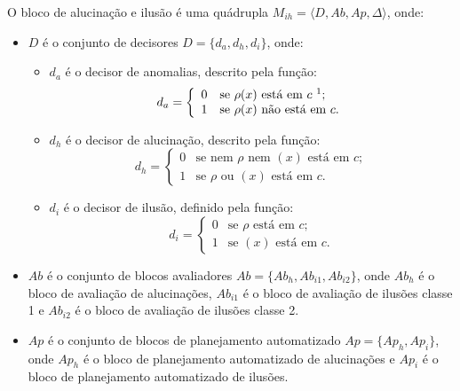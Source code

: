 \begin{definition}
\label{def:illuHallu}
    O bloco de alucinação e ilusão é uma quádrupla $M_{ih} = \langle D, Ab, Ap, \Delta \rangle$, onde:
    
    \begin{itemize}
        \item $D$ é o conjunto de decisores $D = \{d_{a}, d_{h}, d_{i}\}$, onde:
             \begin{itemize}
                \item $d_{a}$ é o decisor de anomalias, descrito pela função:
                \[ d_{a} = \left\{ \begin{array}{ll}
                0 & \mbox{se $\rho(x)$ está em $c$ \footnotemark};\\
                1 & \mbox{se $\rho(x)$ não está em $c$}.\end{array} \right. \]
             
                \item $d_{h}$ é o decisor de alucinação, descrito pela função:
                \[ d_{h} = \left\{ \begin{array}{ll}
                0 & \mbox{se nem $\rho$ nem $(x)$ está em $c$};\\
                1 & \mbox{se $\rho$ ou $(x)$ está em $c$}.\end{array} \right. \]
                
                \item $d_{i}$ é o decisor de ilusão, definido pela função:
                \[ d_{i} = \left\{ \begin{array}{ll}
                0 & \mbox{se $\rho$ está em $c$};\\
                1 & \mbox{se $(x)$ está em $c$}.\end{array} \right. \]
            \end{itemize}
        
        
        \item $Ab$ é o conjunto de blocos avaliadores $Ab = \{Ab_{h}, Ab_{i1}, Ab_{i2}\}$, onde $Ab_{h}$ é o bloco de avaliação de alucinações, $Ab_{i1}$ é o bloco de avaliação de ilusões classe 1 e $Ab_{i2}$ é o bloco de avaliação de ilusões classe 2.
        
        \item $Ap$ é o conjunto de blocos de planejamento automatizado $Ap = \{Ap_{h}, Ap_{i}\}$, onde $Ap_{h}$ é o bloco de planejamento automatizado de alucinações e $Ap_{i}$ é o bloco de planejamento automatizado de ilusões.
        

\end{itemize}
\end{definition}
